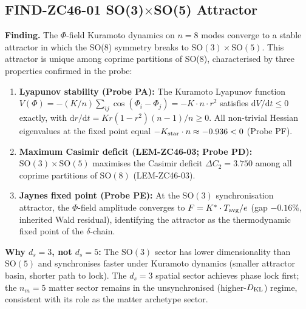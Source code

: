 \documentclass[12pt, a4paper]{article}
\begin{document}
\subsection{FIND-ZC46-01 \quad SO(3)$\times$SO(5) Attractor}


\begin{derivedbox}[title={FIND-ZC46-01: SO(3)$\times$SO(5) Is
  the Unique Stable Attractor of $\Phi$-field Dynamics on $n=8$
  Modes (Near-Formal)}]

\textbf{Finding.}
The $\Phi$-field Kuramoto dynamics on $n = 8$ modes converge to a
stable attractor in which the SO(8) symmetry breaks to
$\mathrm{SO}(3) \times \mathrm{SO}(5)$.
This attractor is unique among coprime partitions of SO(8),
characterised by three properties confirmed in the probe:

\begin{enumerate}[leftmargin=*, itemsep=3pt]
\item \textbf{Lyapunov stability (Probe PA):}
  The Kuramoto Lyapunov function
  $V(\Phi) = -(K/n)\sum_{ij}\cos(\Phi_i - \Phi_j) = -K\cdot n\cdot r^2$
  satisfies $\mathrm{d}V/\mathrm{d}t \leq 0$ exactly, with
  $\mathrm{d}r/\mathrm{d}t = K r(1-r^2)(n-1)/n \geq 0$.
  All non-trivial Hessian eigenvalues at the fixed point equal
  $-K_{\rm star}\cdot n \approx -0.936 < 0$ (Probe PF).

\item \textbf{Maximum Casimir deficit (LEM-ZC46-03; Probe PD):}
  $\mathrm{SO}(3)\times\mathrm{SO}(5)$ maximises the Casimir
  deficit $\Delta C_2 = 3.750$ among all coprime partitions of
  $\mathrm{SO}(8)$ (LEM-ZC46-03).

\item \textbf{Jaynes fixed point (Probe PE):}
  At the $\mathrm{SO}(3)$ synchronisation attractor, the
  $\Phi$-field amplitude converges to $F = K^*\cdot T_{\rm avg}/e$
  (gap $-0.16\%$, inherited Wald residual), identifying the
  attractor as the thermodynamic fixed point of the
  $\delta$-chain.
\end{enumerate}

\textbf{Why $d_s = 3$, not $d_s = 5$:}
The $\mathrm{SO}(3)$ sector has lower dimensionality than
$\mathrm{SO}(5)$ and synchronises faster under Kuramoto dynamics
(smaller attractor basin, shorter path to lock).
The $d_s = 3$ spatial sector achieves phase lock first;
the $n_m = 5$ matter sector remains in the unsynchronised
(higher-$D_{\rm KL}$) regime, consistent with its role as the
matter archetype sector.


\end{derivedbox}
\end{document}
